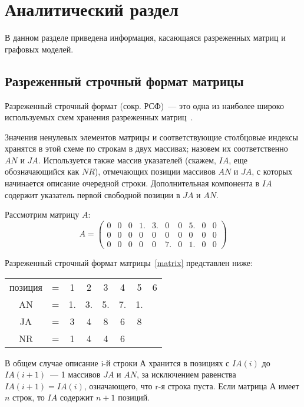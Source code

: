 \chapter{Аналитический раздел}
В данном разделе приведена информация, касающаяся разреженных матриц и графовых моделей.

\section{Разреженный строчный формат матрицы}
Разреженный строчный формат (сокр. РСФ)~--- это одна из наиболее широко используемых схем хранения разреженных матриц~\cite{csr}.

Значения ненулевых элементов матрицы и соответствующие столбцовые индексы хранятся в этой схеме по строкам в двух массивах; назовем их соответственно $AN$ и $JA$. 
Используется также массив указателей (скажем, $IA$, еще обозначающийся как $NR$), отмечающих позиции массивов $AN$ и $JA$, с которых начинается описание очередной строки. Дополнительная компонента в $IA$ содержит указатель первой свободной позиции в $JA$ и $AN$. 

Рассмотрим матрицу $A$:
\begin{equation}
	\label{matrix}
	A = \begin{pmatrix}
		0 & 0 & 0 & 1. & 3. & 0 & 0 & 5. & 0 & 0 \\
		0 & 0 & 0 & 0 & 0 & 0 & 0 & 0 & 0 & 0 \\
		0 & 0 & 0 & 0 & 0 & 7. & 0 & 1. & 0 & 0 				
	\end{pmatrix}
\end{equation}

Разреженный строчный формат матрицы~\ref{matrix} представлен ниже:
\begin{table}[h!]
	\begin{center}
		\begin{tabular}{c c c c c c c c}
			позиция & = & 1 & 2 & 3 & 4 & 5 & 6 \\
			AN & = & 1. & 3. & 5. & 7. & 1. & \\
			JA & = & 3 & 4 & 8 & 6 & 8 & \\
			NR & = & 1 & 4 & 4 & 6 & & 
		\end{tabular}
	\end{center}
\end{table}

В общем случае описание i-й строки $А$ хранится в позициях с $IA(i)$ до $IA(i + 1)$~--- 1 массивов $JA$ и $AN$, за исключением равенства $IA(i + 1) = IA(i)$, означающего, что r-я строка пуста. Если матрица $А$ имеет $n$ строк, то $IA$ содержит $n + 1$ позиций. 
		

